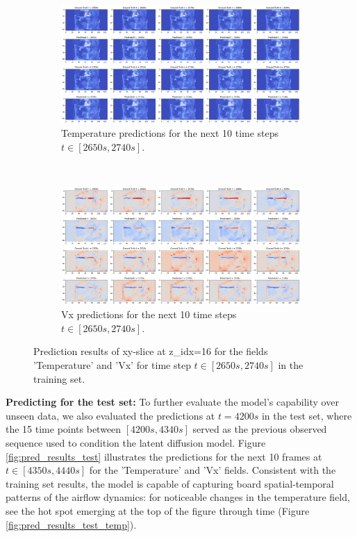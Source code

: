 \documentclass[final-report]{article-template}
\begin{document}
\begin{figure}[!htb]
    \centering
    \begin{subfigure}[t]{0.99\textwidth}
        \centering
        \includegraphics[width=\textwidth]{figures/temp_10_2650.png}
        \caption{Temperature predictions for the next 10 time steps $t \in [2650s, 2740s]$.}
    \end{subfigure} \\[8mm]
    \begin{subfigure}[t]{0.99\textwidth}
        \centering
        \includegraphics[width=\textwidth]{figures/vx_10_2650.png}
        \caption{Vx predictions for the next 10 time steps $t \in [2650s, 2740s]$.}
    \end{subfigure}
    \caption{Prediction results of xy-slice at z\_idx=16 for the fields 'Temperature' and 'Vx' for time step $t \in [2650s, 2740s]$ in the training set.}
    \label{fig:pred_results_training}
\end{figure}
\textbf{Predicting for the test set:} To further evaluate the model's capability over unseen data, we also evaluated the predictions at $t = 4200s$ in the test set, where the 15 time points between $[4200s, 4340s]$ served as the previous observed sequence used to condition the latent diffusion model. Figure \ref{fig:pred_results_test} illustrates the predictions for the next 10 frames at $t \in [4350s, 4440s]$ for the 'Temperature' and 'Vx' fields. Consistent with the training set results, the model is capable of capturing board spatial-temporal patterns of the airflow dynamics: for noticeable changes in the temperature field, see the hot spot emerging at the top of the figure through time (Figure \ref{fig:pred_results_test_temp}).
\end{document}
